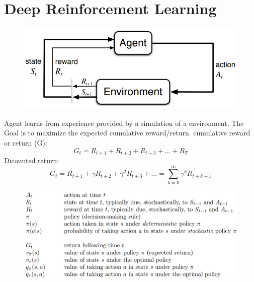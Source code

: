 \section{Deep Reinforcement Learning}
\begin{figure}[!h]
    \includegraphics[width = 0.8\columnwidth]{figures/DeepReinforcementLearning/EnvironmentAgent.png}
\end{figure}

Agent learns from experience provided by a simulation of a environment.
The Goal is to maximize the expected cumulative reward/return.
cumulative reward or return (G):
\[
G_t = R_{t+1} + R_{t+2} + R_{t+3} + \dots + R_T
\]
Dicounted return:
\[
G_t = R_{t+1} + \gamma R_{t+2} +\gamma^2 R_{t+3} + \dots = \sum_{k=0}^{\infty}\gamma^k R_{t+k+1}
\]
\begin{figure}[!h]
    \includegraphics[width = \columnwidth]{figures/DeepReinforcementLearning/OverviewNotation.png}
\end{figure}
